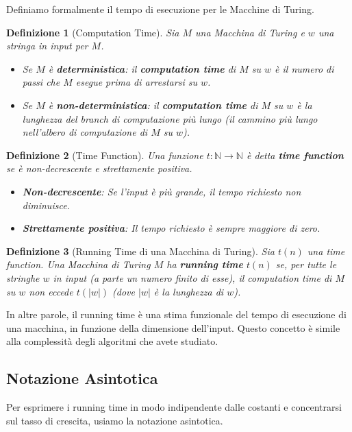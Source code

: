 \documentclass[a4paper]{article}
\newtheorem{definition}{Definizione}[section]
\begin{document}
Definiamo formalmente il tempo di esecuzione per le Macchine di Turing.

\begin{definition}[Computation Time]
Sia $M$ una Macchina di Turing e $w$ una stringa in input per $M$.
\begin{itemize}
    \item Se $M$ è \textbf{deterministica}: il \textbf{computation time} di $M$ su $w$ è il numero di passi che $M$ esegue prima di arrestarsi su $w$.
    \item Se $M$ è \textbf{non-deterministica}: il \textbf{computation time} di $M$ su $w$ è la lunghezza del \emph{branch di computazione più lungo} (il cammino più lungo nell'albero di computazione di $M$ su $w$).
\end{itemize}
\end{definition}

\begin{definition}[Time Function]
Una funzione $t: \mathbb{N} \to \mathbb{N}$ è detta \textbf{time function} se è non-decrescente e strettamente positiva.
\begin{itemize}
    \item \textbf{Non-decrescente}: Se l'input è più grande, il tempo richiesto non diminuisce.
    \item \textbf{Strettamente positiva}: Il tempo richiesto è sempre maggiore di zero.
\end{itemize}
\end{definition}

\begin{definition}[Running Time di una Macchina di Turing]
Sia $t(n)$ una time function. Una Macchina di Turing $M$ ha \textbf{running time} $t(n)$ se, per tutte le stringhe $w$ in input (a parte un numero finito di esse), il computation time di $M$ su $w$ non eccede $t(|w|)$ (dove $|w|$ è la lunghezza di $w$).
\end{definition}
In altre parole, il running time è una stima funzionale del tempo di esecuzione di una macchina, in funzione della dimensione dell'input. Questo concetto è simile alla complessità degli algoritmi che avete studiato.

\subsection{Notazione Asintotica}
Per esprimere i running time in modo indipendente dalle costanti e concentrarsi sul tasso di crescita, usiamo la notazione asintotica.
\end{document}
